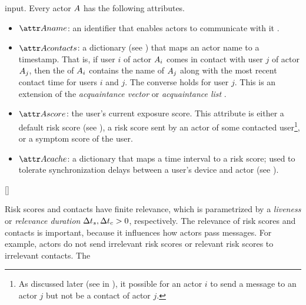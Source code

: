 input. Every actor $A$ has the following attributes.
%
\begin{itemize}
	\item $\aActorName$: an identifier that enables actors to communicate with it \cite{Hewitt1977, AghaThesis1985}.
	\item $\aActorContacts$: a dictionary (see ) that maps an actor name to a timestamp. That is, if user $i$ of actor $A_i$ comes in contact with user $j$ of actor $A_j$, then the \emph{\nContactsAttr} of $A_i$ contains the name of $A_j$ along with the most recent contact time for users $i$ and $j$. The converse holds for user $j$. This is an extension of the \emph{acquaintance vector} \cite{Hewitt1977} or \emph{acquaintance list} \cite{AghaThesis1985, Agha1985}.
	\item $\aActorScore$: the user's current exposure score. This attribute is either a default risk score (see \cDefaultScore), a risk score sent by an actor of some contacted user\footnote{As discussed later (see \cHandleContactMessage{} in ), it possible for an actor $i$ to send a message to an actor $j$ but not be a contact of actor $j$.}, or a symptom score of the user.
	\item $\aActorCache$: a dictionary that maps a time interval to a risk score; used to tolerate synchronization delays between a user's device and actor (see ).
\end{itemize}
%
\begin{function}{\nCreateActor}
\mState{\aActorName \assign \cCreateName}
\mState{\aActorContacts \assign \emptyset}
\mState{\aActorScore \assign \cDefaultScore[\vActor]}
\mState{\aActorCache \assign \emptyset}
\mReturn{\vActor}
\end{function}
\begin{function}{\nDefaultScore}[\vActor]
\mState{\aScoreSender \assign \aActorName}
\mReturn{\vScore}
\end{function}
%
Risk scores and contacts have finite relevance, which is parametrized by a
\emph{liveness} or \emph{relevance duration} ${\Delta}t_s, {\Delta}t_c > 0$,
respectively. The relevance of risk scores and contacts is important, because
it influences how actors pass messages. For example, actors do not send
irrelevant risk scores or relevant risk scores to irrelevant contacts. The
